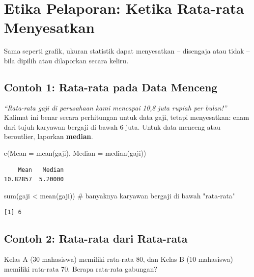 \documentclass[
  indonesian,
  letterpaper,
]{book}
\newenvironment{Shaded}{\begin{snugshade}}{\end{snugshade}}
\newcommand{\AttributeTok}[1]{\textcolor[rgb]{0.40,0.45,0.13}{#1}}
\newcommand{\CommentTok}[1]{\textcolor[rgb]{0.37,0.37,0.37}{#1}}
\newcommand{\FunctionTok}[1]{\textcolor[rgb]{0.28,0.35,0.67}{#1}}
\newcommand{\NormalTok}[1]{\textcolor[rgb]{0.00,0.23,0.31}{#1}}
\newcommand{\SpecialCharTok}[1]{\textcolor[rgb]{0.37,0.37,0.37}{#1}}
\begin{document}
\section{Etika Pelaporan: Ketika Rata-rata
Menyesatkan}\label{etika-pelaporan-ketika-rata-rata-menyesatkan}

Sama seperti grafik, ukuran statistik dapat menyesatkan -- disengaja
atau tidak -- bila dipilih atau dilaporkan secara keliru.

\subsection{Contoh 1: Rata-rata pada Data
Menceng}\label{contoh-1-rata-rata-pada-data-menceng}

\emph{``Rata-rata gaji di perusahaan kami mencapai 10,8 juta rupiah per
bulan!''} Kalimat ini benar secara perhitungan untuk data gaji, tetapi
menyesatkan: enam dari tujuh karyawan bergaji di bawah 6 juta. Untuk
data menceng atau beroutlier, laporkan \textbf{median}.

\begin{Shaded}
\begin{Highlighting}[]
\FunctionTok{c}\NormalTok{(}\AttributeTok{Mean =} \FunctionTok{mean}\NormalTok{(gaji), }\AttributeTok{Median =} \FunctionTok{median}\NormalTok{(gaji))}
\end{Highlighting}
\end{Shaded}

\begin{verbatim}
    Mean   Median 
10.82857  5.20000 
\end{verbatim}

\begin{Shaded}
\begin{Highlighting}[]
\FunctionTok{sum}\NormalTok{(gaji }\SpecialCharTok{\textless{}} \FunctionTok{mean}\NormalTok{(gaji))   }\CommentTok{\# banyaknya karyawan bergaji di bawah "rata{-}rata"}
\end{Highlighting}
\end{Shaded}

\begin{verbatim}
[1] 6
\end{verbatim}

\subsection{Contoh 2: Rata-rata dari
Rata-rata}\label{contoh-2-rata-rata-dari-rata-rata}

Kelas A (30 mahasiswa) memiliki rata-rata 80, dan Kelas B (10 mahasiswa)
memiliki rata-rata 70. Berapa rata-rata gabungan?
\end{document}
